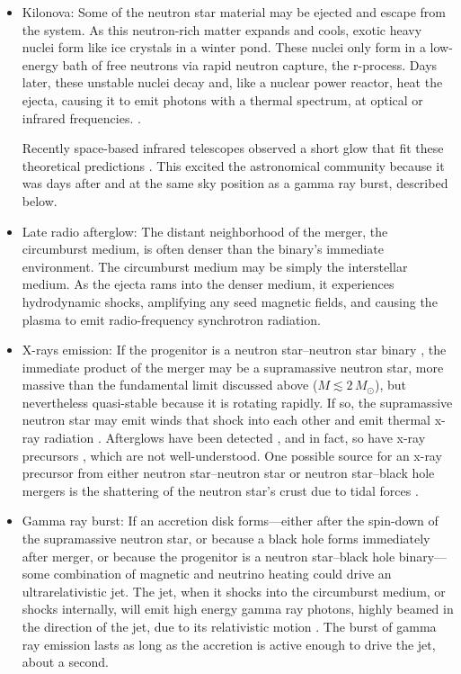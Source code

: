 \begin{itemize}
  \item Kilonova: Some of the neutron star material may be ejected and escape
    from the system. As this neutron-rich matter expands and cools, exotic heavy
    nuclei form like ice crystals in a winter pond. These nuclei only form in a
    low-energy bath of free neutrons via rapid neutron capture, the r-process.
    Days later, these unstable nuclei decay and, like a nuclear power reactor,
    heat the ejecta, causing it to emit photons with a
    thermal spectrum, at optical or infrared frequencies.
    \citep{
      li1998-transients,
      robe2011-transients,
      metz2012-most_promising,
      kase2013-opacities}.

    Recently space-based infrared telescopes observed a short glow that
    fit these theoretical predictions
    \citep{berg2013-130603B,tanv2013-130603B}. This excited the astronomical
    community because it was days after and at the same sky position as a gamma
    ray burst, described below.
  \item Late radio afterglow: The distant neighborhood of the merger, the
    circumburst medium, is often denser than the binary's immediate environment.
    The circumburst medium may be simply the interstellar medium.
    As the ejecta rams into the denser medium, it experiences hydrodynamic
    shocks, amplifying any seed magnetic fields, and causing the plasma to
    emit radio-frequency synchrotron radiation.
  \item X-rays emission: If the progenitor is a neutron star--neutron
    star binary \nsns, the immediate product of the merger may be
    a supramassive neutron star,
    more massive than the fundamental
    limit discussed above ($M\lesssim2\,M_\odot$), but nevertheless quasi-stable
    because it is rotating rapidly.
    If so, the supramassive neutron star may emit winds that shock
    into each other and emit thermal x-ray radiation \citep{rezz2015-two_winds}.
    Afterglows have been detected \citep{fong2012-xray_afterglow}, and in fact,
    so have x-ray precursors \citep{troj2010-sgrb_precursors}, which are
    not well-understood. One possible source for an x-ray precursor from either
    neutron star--neutron star \nsns or neutron star--black hole \nsbh mergers is
    the shattering of the neutron star's crust due to tidal forces
    \citep{tsan2012-shattering}.
  \item Gamma ray burst: If an accretion disk forms---either after the
    spin-down of the supramassive neutron star, or because a black hole forms
    immediately after merger, or because the progenitor is a neutron star--black
    hole \nsbh binary---some combination of magnetic and neutrino heating
    could drive an ultrarelativistic jet. The jet, when it shocks into the
    circumburst medium, or shocks internally, will emit high energy gamma ray
    photons, highly beamed in the direction of the jet, due to its relativistic
    motion \citep{eich1989-grb_bns,nara1992-grbs_nsns_bhns}.
    The burst of gamma ray emission lasts as long as the accretion is
    active enough to drive the jet, about a second.


\end{itemize}
